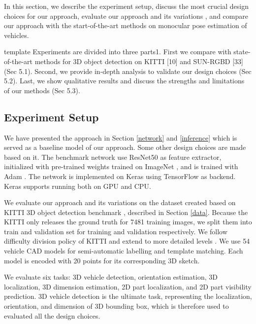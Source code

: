 In this section, we describe the experiment setup, discuss the most crucial design choices for our approach, evaluate our approach and its variations , and compare our approach with the start-of-the-art methods on monocular pose estimation of vehicles.  

template \tbd Experiments are divided into three parts1. First we compare with state-of-the-art methods for 3D object detection on KITTI [10] and SUN-RGBD [33] (Sec 5.1). Second, we provide in-depth analysis to validate our design choices (Sec 5.2). Last, we show qualitative results and discuss the strengths and limitations of our methods (Sec 5.3).

\subsection{Experiment Setup}

We have presented the approach in Section \ref{network} and \ref{inference} which is served as a baseline model of our approach. Some other design choices are made based on it. The benchmark network use ResNet50 \cite{DBLP:journals/corr/HeZRS15} as feature extractor, initialized with pre-trained weights trained on ImageNet \cite{DBLP:Russakovsky14}, and is trained with Adam \cite{DBLP:journals/corr/KingmaB14}. The network is implemented on Keras \cite{chollet2015keras} using TensorFlow \cite{tensorflow2015-whitepaper} as backend. Keras supports running both on GPU and CPU. 

We evaluate our approach and its variations on the dataset created based on KITTI 3D object detection benchmark \cite{Geiger2012CVPR}, described in Section \ref{data}. Because the KITTI only releases the ground truth for 7481 training images, we split them into train and validation set for training and validation respectively. We follow difficulty division policy of  KITTI and extend to more detailed levels \tbd. We use 54 vehicle CAD models \cite{NIPS2012_4562} for semi-automatic labelling and template matching. Each model is encoded with 20 points for its corresponding 3D sketch.

We evaluate six tasks: 3D vehicle detection, orientation estimation, 3D localization, 3D dimension estimation, 2D part localization, and 2D part visibility prediction. 3D vehicle detection is the ultimate task, representing the localization, orientation, and dimension of 3D bounding box,  which is therefore used to evaluated all the design choices.